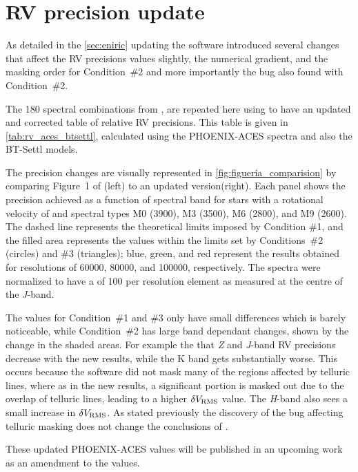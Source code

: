 
\section{RV precision update}
\label{}
As detailed in the \cref{sec:eniric} updating the software introduced several changes that affect the {RV} precisions values slightly, the numerical gradient, and the masking order for Condition~\#2 and more importantly the bug also found with Condition~\#2.

The 180 spectral combinations from \citet{figueira_radial_2016}, are repeated here using \eniric{} to have an updated and corrected table of relative {RV} precisions.
This table is given in \cref{tab:rv_aces_btsettl}, calculated using the {PHOENIX-ACES} spectra and also the {BT-Settl} models.
 
The precision changes are visually represented in \cref{fig:figueria_comparision} by comparing Figure~1 of \citet{figueira_radial_2016} (left) to an updated version(right).
Each panel shows the precision achieved as a function of spectral band for stars with a rotational velocity of \kmps{} and spectral types M0 (3900\K), M3 (3500\K), M6 (2800\K), and M9 (2600\K).
The dashed line represents the theoretical limits imposed by Condition \#1, and the filled area represents the values within the limits set by Conditions~\#2 (circles) and \#3 (triangles); blue, green, and red represent the results obtained for resolutions of 60000, 80000, and 100000, respectively.
The spectra were normalized to have a \snr{} of 100 per resolution element as measured at the centre of the \emph{J}-band.

The values for Condition~\#1 and \#3 only have small differences which is barely noticeable, while Condition~\#2 has large band dependant changes, shown by the change in the shaded areas.
For example the that \emph{Z} and \emph{J}-band RV precisions decrease with the new results, while the {K} band gets substantially worse.
This occurs because the software did not mask many of the regions affected by telluric lines, where as in the new results, a significant portion is masked out due to the overlap of telluric lines, leading to a higher \(\delta V_{\textrm{RMS}}\) value.
The \emph{H}-band also sees a small increase in \(\delta V_{\textrm{RMS}}\).
As stated previously the discovery of the bug affecting telluric masking does not change the conclusions of \citet{figueira_radial_2016}.

These updated {PHOENIX-ACES} values will be published in an upcoming work as an amendment to the \citep{figueira_radial_2016} values.

